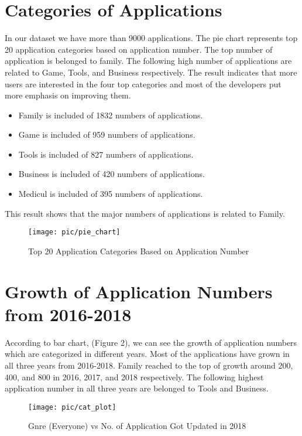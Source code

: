 \section*{Categories of Applications}
In our dataset we have more than 9000 applications. The pie chart represents top 20 application categories based on application number. The top number of application is belonged to family. The following high number of applications are related to Game, Tools, and Business respectively. The result indicates that more users are interested in the four top categories and most of the developers put more emphasis on improving them.
\begin{itemize}
\item
  Family is included of 1832  numbers of applications.
\item
  Game is included of 959  numbers of applications.
  \item
  Tools is included of 827  numbers of applications.
\item
  Business is included of 420  numbers of applications.
\item
  Medicul is included of 395  numbers of applications.
\end{itemize}

This result shows that the major numbers of applications is related to Family.
\begin{figure}
\centering
\texttt{[image: pic/pie\_chart]}
\caption{Top 20 Application Categories Based on Application Number}
\label{fig:1}
\end{figure}

\section*{Growth of Application Numbers from 2016-2018}
According to bar chart, (Figure 2), we can see the growth of application numbers which are categorized in different years. Most of the applications have grown in all three years from 2016-2018.
Family reached to the top of growth around 200, 400, and 800 in 2016, 2017, and 2018 respectively. The following highest application number in all three years are belonged to Tools and Business.

\begin{figure}
\centering
\texttt{[image: pic/cat\_plot]}
\caption{Gnre (Everyone) vs No. of Application Got Updated in 2018} 
\label{fig:2}
\end{figure}	

